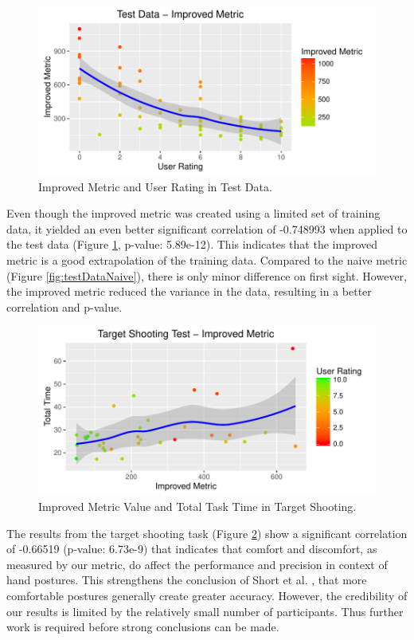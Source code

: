 \begin{figure}[h]
\centering
\includegraphics[width=\textwidth]{TestDataImproved}
\caption{Improved Metric and User Rating in Test Data.}
\label{fig:testData}
\end{figure}

Even though the improved metric was created using a limited set of training data, it yielded an even better significant correlation of -0.748993 when applied to the test data (Figure \ref{fig:testData}, p-value: 5.89e-12). This indicates that the improved metric is a good extrapolation of the training data. Compared to the naive metric (Figure \ref{fig:testDataNaive}), there is only minor difference on first sight. However, the improved metric reduced the variance in the data, resulting in a better correlation and p-value.

\begin{figure}[h]
\centering
\includegraphics[width=\textwidth]{TargetShooting}
\caption{Improved Metric Value and Total Task Time in Target Shooting.}
\label{fig:targetShooting}
\end{figure}

The results from the target shooting task (Figure \ref{fig:targetShooting}) show a significant correlation of -0.66519 (p-value: 6.73e-9) that indicates that comfort and discomfort, as measured by our metric, do affect the performance and precision in context of hand postures. This strengthens the conclusion of Short et al. \cite{short1999precision}, that more comfortable postures generally create greater accuracy. However, the credibility of our results is limited by the relatively small number of participants. Thus further work is required before strong conclusions can be made.